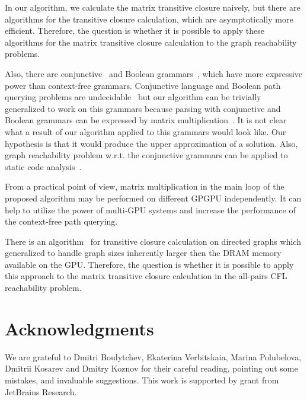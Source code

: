 \documentclass[runningheads,a4paper]{llncs}
\begin{document}
In our algorithm, we calculate the matrix transitive closure naively, but there are algorithms for the transitive closure calculation, which are asymptotically more efficient. Therefore, the question is whether it is possible to apply these algorithms for the matrix transitive closure calculation to the graph reachability problems.

Also, there are conjunctive~\cite{okhotinConjAndBool} and Boolean grammars~\cite{okhotinBoolean}, which have more expressive power than context-free grammars. Conjunctive language and Boolean path querying problems are undecidable~\cite{hellingsRelational} but our algorithm can be trivially generalized to work on this grammars because parsing with conjunctive and Boolean grammars can be expressed by matrix multiplication~\cite{okhotin_cyk}. It is not clear what a result of our algorithm applied to this grammars would look like. Our hypothesis is that it would produce the upper approximation of a solution. Also, graph reachability problem w.r.t. the conjunctive grammars can be applied to static code analysis~\cite{zhang2017context}.

From a practical point of view, matrix multiplication in the main loop of the proposed algorithm may be performed on different GPGPU independently. It can help to utilize the power of multi-GPU systems and increase the performance of the context-free path querying.

There is an algorithm~\cite{apspGPU} for transitive closure calculation on directed graphs which generalized to handle graph sizes inherently larger then the DRAM memory available on the GPU. Therefore, the question is whether it is possible to apply this approach to the matrix transitive closure calculation in the all-pairs CFL reachability problem.

\section*{Acknowledgments}%

We are grateful to Dmitri Boulytchev, Ekaterina Verbitskaia, Marina Polubelova, Dmitrii Kosarev and Dmitry Koznov for their careful reading, pointing out some mistakes, and invaluable suggestions.
This work is supported by grant from JetBrains Research.




\end{document}

